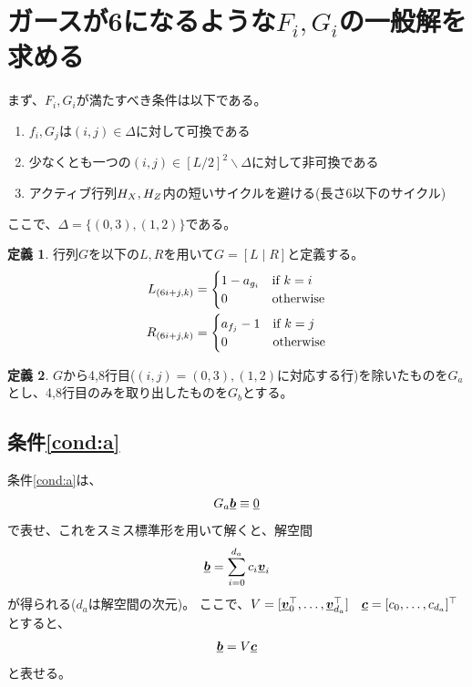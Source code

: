 \documentclass[a4paper,11pt,dvipdfmx]{jsarticle}
\theoremstyle{definition}
\newtheorem{definition}{定義}[section]
\begin{document}
\section{ガースが6になるような$F_i, G_i$の一般解を求める}
まず、$F_i, G_i$が満たすべき条件は以下である。
\begin{enumerate}[label=\Alph*', ref=\Alph*']
  \item $f_i,G_j$は$(i,j)\in\Delta$に対して可換である\label{cond:a}
  \item 少なくとも一つの$(i,j)\in[L/2]^2\backslash\Delta$に対して非可換である\label{cond:b}
  \item アクティブ行列$H_X,H_Z$内の短いサイクルを避ける(長さ6以下のサイクル)\label{cond:c}
\end{enumerate}
ここで、$\Delta = \{(0,3), (1,2)\}$である。

\begin{definition}\label{def:02081}
  行列$G$を以下の$L,R$を用いて$G = [L\mid R]$と定義する。
\begin{align}
  L_{(6i+j, k)} &= \begin{cases}
    1-a_{g_i} & \text{if } k = i\\
    0 & \text{otherwise}
  \end{cases}\\
  R_{(6i+j, k)} &= \begin{cases}
    a_{f_j}-1 & \text{if } k = j\\
    0 & \text{otherwise}
  \end{cases}
\end{align}
\end{definition}

\begin{definition}\label{def:02082}
  $G$から4,8行目($(i,j)=(0,3),(1,2)$に対応する行)を除いたものを$G_a$とし、4,8行目のみを取り出したものを$G_b$とする。
\end{definition}

\subsection{条件\ref{cond:a}}
条件\ref{cond:a}は、
\begin{align}
  G_a \underline{\bm{b}} \equiv \underline{0}\label{02083}
\end{align}
で表せ、これをスミス標準形を用いて解くと、解空間
\begin{align}
  \underline{\bm{b}} = \sum_{i=0}^{d_a} c_i\underline{\bm{v}}_i\label{02084}
\end{align}
が得られる($d_a$は解空間の次元)。
ここで、$V=[\underline{\bm{v}}_0^\top,\dots,\underline{\bm{v}}_{d_a}^\top]\quad \underline{\bm{c}}=[c_0,\dots,c_{d_a}]^\top$とすると、
\begin{align}
  \underline{\bm{b}} = V\underline{\bm{c}}\label{02085}
\end{align}
と表せる。
\end{document}
